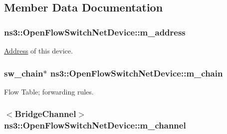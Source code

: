 \subsection{Member Data Documentation}
\subsubsection[{\texorpdfstring{m\+\_\+address}{m_address}}]{ ns3\+::\+Open\+Flow\+Switch\+Net\+Device\+::m\+\_\+address\hspace{0.3cm}{\ttfamily [private]}}\hypertarget{classns3_1_1OpenFlowSwitchNetDevice_a0278390fb81f277dac19d25482ad1bef}{}\label{classns3_1_1OpenFlowSwitchNetDevice_a0278390fb81f277dac19d25482ad1bef}


\hyperlink{classns3_1_1Address}{Address} of this device. 

\subsubsection[{\texorpdfstring{m\+\_\+chain}{m_chain}}]{\setlength{\rightskip}{0pt plus 5cm}sw\+\_\+chain$\ast$ ns3\+::\+Open\+Flow\+Switch\+Net\+Device\+::m\+\_\+chain\hspace{0.3cm}{\ttfamily [private]}}\hypertarget{classns3_1_1OpenFlowSwitchNetDevice_aebd93d8b1a9c5c52077e02487953cfe4}{}\label{classns3_1_1OpenFlowSwitchNetDevice_aebd93d8b1a9c5c52077e02487953cfe4}


Flow Table; forwarding rules. 

\subsubsection[{\texorpdfstring{m\+\_\+channel}{m_channel}}]{$<${\bf Bridge\+Channel}$>$ ns3\+::\+Open\+Flow\+Switch\+Net\+Device\+::m\+\_\+channel\hspace{0.3cm}{\ttfamily [private]}}\hypertarget{classns3_1_1OpenFlowSwitchNetDevice_a2544f1285545cf8e45878277be7b6778}{}\label{classns3_1_1OpenFlowSwitchNetDevice_a2544f1285545cf8e45878277be7b6778}



